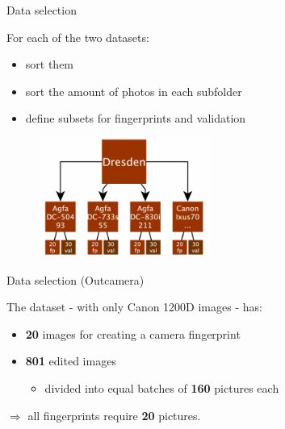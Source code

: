 \begin{frame}[fragile]{Data selection}

    For each of the two datasets:
    \begin{itemize}
        \item sort them
        \item sort the amount of photos in each subfolder
        \item define subsets for fingerprints and validation
    \end{itemize}
    
    \medskip
    
    \begin{figure}
        \centering
        \includegraphics[width=0.5\textwidth]{../drawable/diagram.png}
    \end{figure}
    
\end{frame}

\begin{frame}{Data selection (Outcamera)}

    The dataset - with only Canon 1200D images - has:
    \begin{itemize}
        \item \textbf{20} images for creating a camera fingerprint
        \item \textbf{801} edited images \begin{itemize}
            \item divided into equal batches of \textbf{160} pictures each
        \end{itemize}
    \end{itemize}
    
    \medskip 
    
    $\Rightarrow$ all fingerprints require \textbf{20} pictures. 
    
    \medskip
    
    
\end{frame}

